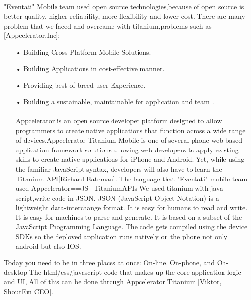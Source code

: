 \documentclass[12pt,a4paper,class,twoside,openany]{report}
\begin{document}
{  \paragraph*{\hspace{.9 cm} } "Eventati"  Mobile team used open source technologies,because of open source is better quality, higher reliability, more flexibility and  lower cost. There are many problem that we faced and overcame with titanium,problems such as [Appcelerator,Inc]:             
  \begin{itemize}
\item[•] Building Cross Platform Mobile Solutions.
\item[•] Building Applications in cost-effective manner.
\item[•] Providing best of breed user Experience.
\item[•] Building a sustainable, maintainable for application and team .
 \\  \paragraph*{\hspace{.9 cm} }  Appcelerator is an open source developer platform designed to allow programmers to create native applications that function across a wide range of devices.Appcelerator Titanium Mobile is one of several phone web based application framework solutions allowing web developers to apply existing skills to create native applications for iPhone and Android. Yet, while using the familiar JavaScript syntax, developers will also have to learn the Titanium API[Richard Bateman].
 The language that "Eventati" mobile team  used
 Appcelerator==JS+TitaniumAPIs        
We used titanium with java script,write code in JSON. JSON (JavaScript Object Notation) is a lightweight data-interchange format. It is easy for humans to read and write. It is easy for machines to parse and generate. It is based on a subset of the JavaScript Programming Language. The code gets compiled using the device SDKs so the deployed application runs natively on the phone not only android but also IOS. 

\end{itemize}
 Today you need to be in three places at once: On-line, On-phone, and On-desktop
The html/css/javascript code that makes up the core application logic and UI, All of this can be done through Appcelerator Titanium [Viktor, ShoutEm CEO].

}
\end{document}
